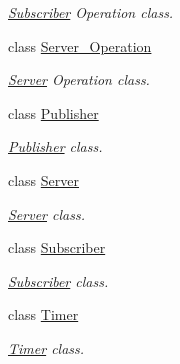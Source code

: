 \begin{DoxyCompactItemize}
\begin{DoxyCompactList}\small\item\em \hyperlink{classzcm_1_1Subscriber}{Subscriber} Operation class. \end{DoxyCompactList}\item 
class \hyperlink{classzcm_1_1Server__Operation}{Server\-\_\-\-Operation}
\begin{DoxyCompactList}\small\item\em \hyperlink{classzcm_1_1Server}{Server} Operation class. \end{DoxyCompactList}\item 
class \hyperlink{classzcm_1_1Publisher}{Publisher}
\begin{DoxyCompactList}\small\item\em \hyperlink{classzcm_1_1Publisher}{Publisher} class. \end{DoxyCompactList}\item 
class \hyperlink{classzcm_1_1Server}{Server}
\begin{DoxyCompactList}\small\item\em \hyperlink{classzcm_1_1Server}{Server} class. \end{DoxyCompactList}\item 
class \hyperlink{classzcm_1_1Subscriber}{Subscriber}
\begin{DoxyCompactList}\small\item\em \hyperlink{classzcm_1_1Subscriber}{Subscriber} class. \end{DoxyCompactList}\item 
class \hyperlink{classzcm_1_1Timer}{Timer}
\begin{DoxyCompactList}\small\item\em \hyperlink{classzcm_1_1Timer}{Timer} class. \end{DoxyCompactList}\end{DoxyCompactItemize}
